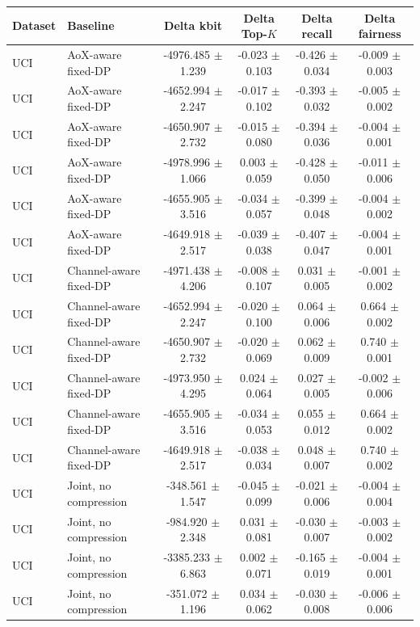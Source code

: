 \begin{tabular}{llcccc}
\toprule
Dataset & Baseline & Delta kbit & Delta Top-$K$ & Delta recall & Delta fairness \\
\midrule
UCI & AoX-aware fixed-DP & -4976.485 $\pm$ 1.239 & -0.023 $\pm$ 0.103 & -0.426 $\pm$ 0.034 & -0.009 $\pm$ 0.003 \\
UCI & AoX-aware fixed-DP & -4652.994 $\pm$ 2.247 & -0.017 $\pm$ 0.102 & -0.393 $\pm$ 0.032 & -0.005 $\pm$ 0.002 \\
UCI & AoX-aware fixed-DP & -4650.907 $\pm$ 2.732 & -0.015 $\pm$ 0.080 & -0.394 $\pm$ 0.036 & -0.004 $\pm$ 0.001 \\
UCI & AoX-aware fixed-DP & -4978.996 $\pm$ 1.066 & 0.003 $\pm$ 0.059 & -0.428 $\pm$ 0.050 & -0.011 $\pm$ 0.006 \\
UCI & AoX-aware fixed-DP & -4655.905 $\pm$ 3.516 & -0.034 $\pm$ 0.057 & -0.399 $\pm$ 0.048 & -0.004 $\pm$ 0.002 \\
UCI & AoX-aware fixed-DP & -4649.918 $\pm$ 2.517 & -0.039 $\pm$ 0.038 & -0.407 $\pm$ 0.047 & -0.004 $\pm$ 0.001 \\
UCI & Channel-aware fixed-DP & -4971.438 $\pm$ 4.206 & -0.008 $\pm$ 0.107 & 0.031 $\pm$ 0.005 & -0.001 $\pm$ 0.002 \\
UCI & Channel-aware fixed-DP & -4652.994 $\pm$ 2.247 & -0.020 $\pm$ 0.100 & 0.064 $\pm$ 0.006 & 0.664 $\pm$ 0.002 \\
UCI & Channel-aware fixed-DP & -4650.907 $\pm$ 2.732 & -0.020 $\pm$ 0.069 & 0.062 $\pm$ 0.009 & 0.740 $\pm$ 0.001 \\
UCI & Channel-aware fixed-DP & -4973.950 $\pm$ 4.295 & 0.024 $\pm$ 0.064 & 0.027 $\pm$ 0.005 & -0.002 $\pm$ 0.006 \\
UCI & Channel-aware fixed-DP & -4655.905 $\pm$ 3.516 & -0.034 $\pm$ 0.053 & 0.055 $\pm$ 0.012 & 0.664 $\pm$ 0.002 \\
UCI & Channel-aware fixed-DP & -4649.918 $\pm$ 2.517 & -0.038 $\pm$ 0.034 & 0.048 $\pm$ 0.007 & 0.740 $\pm$ 0.002 \\
UCI & Joint, no compression & -348.561 $\pm$ 1.547 & -0.045 $\pm$ 0.099 & -0.021 $\pm$ 0.006 & -0.004 $\pm$ 0.004 \\
UCI & Joint, no compression & -984.920 $\pm$ 2.348 & 0.031 $\pm$ 0.081 & -0.030 $\pm$ 0.007 & -0.003 $\pm$ 0.002 \\
UCI & Joint, no compression & -3385.233 $\pm$ 6.863 & 0.002 $\pm$ 0.071 & -0.165 $\pm$ 0.019 & -0.004 $\pm$ 0.001 \\
UCI & Joint, no compression & -351.072 $\pm$ 1.196 & 0.034 $\pm$ 0.062 & -0.030 $\pm$ 0.008 & -0.006 $\pm$ 0.006 \\

\end{tabular}
